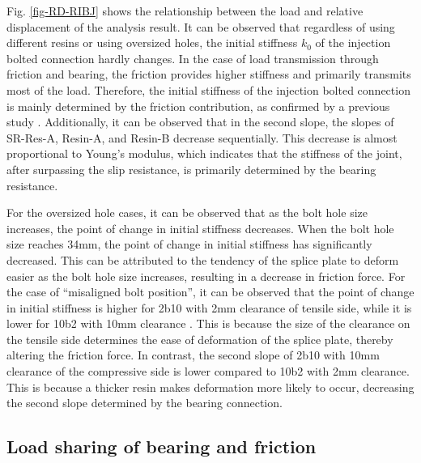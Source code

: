 Fig. \ref{fig-RD-RIBJ} shows the relationship between the load and relative displacement of the analysis result. It can be observed that regardless of using different resins or using oversized holes, the initial stiffness $k_0$ of the injection bolted connection hardly changes. In the case of load transmission through friction and bearing, the friction provides higher stiffness and primarily transmits most of the load. Therefore, the initial stiffness of the injection bolted connection is mainly determined by the friction contribution, as confirmed by a previous study \cite{Chen2023MechanicalConnections}. Additionally, it can be observed that in the second slope, the slopes of SR-Res-A, Resin-A, and Resin-B decrease sequentially. This decrease is almost proportional to Young’s modulus, which indicates that the stiffness of the joint, after surpassing the slip resistance, is primarily determined by the bearing resistance.

For the oversized hole cases, it can be observed that as the bolt hole size increases, the point of change in initial stiffness decreases. When the bolt hole size reaches 34mm, the point of change in initial stiffness has significantly decreased. This can be attributed to the tendency of the splice plate to deform easier as the bolt hole size increases, resulting in a decrease in friction force.
For the case of “misaligned bolt position”, it can be observed that the point of change in initial stiffness is higher for 2b10 with 2mm clearance of tensile side, while it is lower for 10b2 with 10mm clearance  . This is because the size of the clearance on the tensile side determines the ease of deformation of the splice plate, thereby altering the friction force. In contrast, the second slope of 2b10 with 10mm clearance of the compressive side is lower compared to 10b2 with 2mm clearance. This is because a thicker resin makes deformation more likely to occur, decreasing the second slope determined by the bearing connection.

\subsection{Load sharing of bearing and friction}

